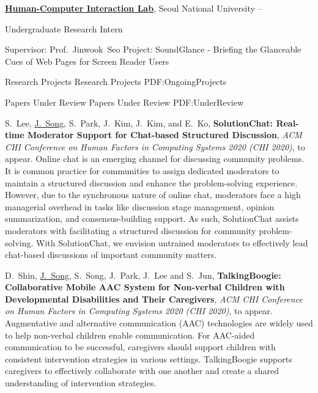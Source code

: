 \documentclass[letterpaper,MMMyyyy,nonstopmode]{template}
\begin{document}
\begin{Body}
\BigGap
\Entry
\href{http://hcil.snu.ac.kr/}
{\textbf{Human-Computer Interaction Lab}},
Seoul National University
\hfill
{} --

\Gap
\BulletItem
Undergraduate Research Intern
\begin{Detail}

\SubBulletItem
Supervisor:
Prof.~Jinwook~Seo
\SubBulletItem
Project:
SoundGlance - Briefing the Glanceable Cues of Web Pages for Screen Reader Users

\end{Detail}



\BigGap
\Section
{Research Projects}
{Research Projects}
{PDF:OngoingProjects}

\SubSection
{Papers Under Review}
{Papers Under Review}
{PDF:UnderReview}

\begingroup
\renewcommand{\MaxNumberedItem}{[88]}

\BigGap
\NumberedItem{[1]}
  S.~Lee, \underline{J.~Song}, S.~Park, J.~Kim, J.~Kim, and E.~Ko,
  \textbf{SolutionChat: Real-time Moderator Support for Chat-based Structured Discussion},
  \textit{ACM CHI Conference on Human Factors in Computing Systems 2020 (CHI 2020)}, to appear.
  \vspace{2mm}\newline
  {\small{
    Online chat is an emerging channel for discussing community problems. It is common practice for communities to assign dedicated moderators to maintain a structured discussion and enhance the problem-solving experience. However, due to the synchronous nature of online chat, moderators face a high managerial overhead in tasks like discussion stage management, opinion summarization, and consensus-building support. As such, SolutionChat assists moderators with facilitating a structured discussion for community problem-solving.
    With SolutionChat, we envision untrained moderators to effectively lead chat-based discussions of important community matters.
  }}


\BigGap
\NumberedItem{[2]}
  D.~Shin, \underline{J.~Song}, S.~Song, J.~Park, J.~Lee and S.~Jun,
  \textbf{TalkingBoogie: Collaborative Mobile AAC System for Non-verbal Children with Developmental Disabilities and Their Caregivers},
  \textit{ACM CHI Conference on Human Factors in Computing Systems 2020 (CHI 2020)}, to appear.
  \vspace{2mm}\newline
  {\small{
    Augmentative and alternative communication (AAC) technologies are widely used to help non-verbal children enable communication. For AAC-aided communication to be successful, caregivers should support children with consistent intervention strategies in various settings. TalkingBoogie supports caregivers to effectively collaborate with one another and create a shared understanding of intervention strategies.
  }}


\end{Body}
\end{document}
